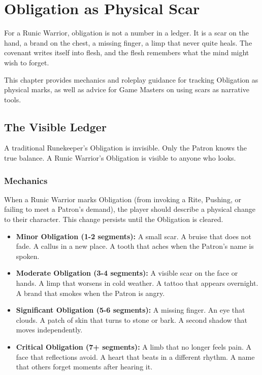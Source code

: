 \section{Obligation as Physical Scar}

For a Runic Warrior, obligation is not a number in a ledger. It is a scar on the hand, a brand on the chest, a missing finger, a limp that never quite heals. The covenant writes itself into flesh, and the flesh remembers what the mind might wish to forget.

This chapter provides mechanics and roleplay guidance for tracking Obligation as physical marks, as well as advice for Game Masters on using scars as narrative tools.

\subsection{The Visible Ledger}

A traditional Runekeeper's Obligation is invisible. Only the Patron knows the true balance. A Runic Warrior's Obligation is visible to anyone who looks.

\subsubsection{Mechanics}

When a Runic Warrior marks Obligation (from invoking a Rite, Pushing, or failing to meet a Patron's demand), the player should describe a physical change to their character. This change persists until the Obligation is cleared.

\begin{itemize}
\item \textbf{Minor Obligation (1-2 segments):} A small scar. A bruise that does not fade. A callus in a new place. A tooth that aches when the Patron's name is spoken.
\item \textbf{Moderate Obligation (3-4 segments):} A visible scar on the face or hands. A limp that worsens in cold weather. A tattoo that appears overnight. A brand that smokes when the Patron is angry.
\item \textbf{Significant Obligation (5-6 segments):} A missing finger. An eye that clouds. A patch of skin that turns to stone or bark. A second shadow that moves independently.
\item \textbf{Critical Obligation (7+ segments):} A limb that no longer feels pain. A face that reflections avoid. A heart that beats in a different rhythm. A name that others forget moments after hearing it.
\end{itemize}

